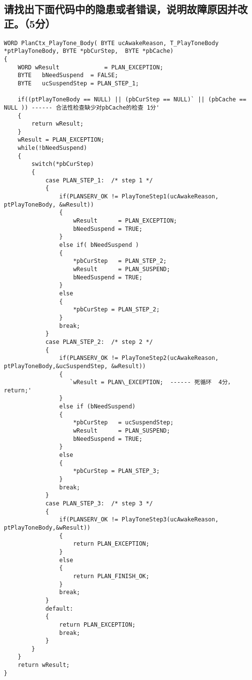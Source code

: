 ﻿\documentclass  [11pt,onecolumn,a4paper]{article}
\begin{document}
\subsection{请找出下面代码中的隐患或者错误，说明故障原因并改正。（5分）}
\begin{lstlisting}[escapeinside=`']
WORD PlanCtx_PlayTone_Body( BYTE ucAwakeReason, T_PlayToneBody *ptPlayToneBody, BYTE *pbCurStep,  BYTE *pbCache)
{
    WORD wResult             = PLAN_EXCEPTION;
    BYTE   bNeedSuspend  = FALSE;
    BYTE   ucSuspendStep = PLAN_STEP_1;

    if((ptPlayToneBody == NULL) || (pbCurStep == NULL)` || (pbCache == NULL )) ------ 合法性检查缺少对pbCache的检查 1分'
    {
        return wResult;
    }
    wResult = PLAN_EXCEPTION;    
    while(!bNeedSuspend)
    {
        switch(*pbCurStep)
        {
            case PLAN_STEP_1:  /* step 1 */
            {
                if(PLANSERV_OK != PlayToneStep1(ucAwakeReason, ptPlayToneBody, &wResult))
                {
                    wResult      = PLAN_EXCEPTION;
                    bNeedSuspend = TRUE;
                }
                else if( bNeedSuspend )
                {
                    *pbCurStep   = PLAN_STEP_2;
                    wResult      = PLAN_SUSPEND;
                    bNeedSuspend = TRUE;
                }
                else
                {
                    *pbCurStep = PLAN_STEP_2;
                }
                break;
            }    
            case PLAN_STEP_2:  /* step 2 */
            {
                if(PLANSERV_OK != PlayToneStep2(ucAwakeReason, ptPlayToneBody,&ucSuspendStep, &wResult))
                {
                   `wResult = PLAN\_EXCEPTION;  ------ 死循环  4分，return;'
                }
                else if (bNeedSuspend)
                {
                    *pbCurStep   = ucSuspendStep;
                    wResult      = PLAN_SUSPEND;
                    bNeedSuspend = TRUE;                
                }
                else
                {
                    *pbCurStep = PLAN_STEP_3;
                }
                break;
            }    
            case PLAN_STEP_3:  /* step 3 */
            {
                if(PLANSERV_OK != PlayToneStep3(ucAwakeReason, ptPlayToneBody,&wResult))
                {
                    return PLAN_EXCEPTION;
                }
                else
                {
                    return PLAN_FINISH_OK;
                }
                break;
            }    
            default:
            {
                return PLAN_EXCEPTION;
                break;
            }
        }    
    }
    return wResult;
}
\end{lstlisting}
\end{document}
